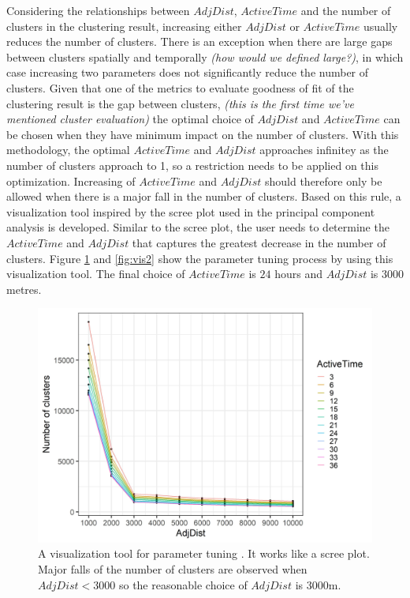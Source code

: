 Considering the relationships between \(AdjDist\), \(ActiveTime\) and
the number of clusters in the clustering result, increasing either
\(AdjDist\) or \(ActiveTime\) usually reduces the number of clusters.
There is an exception when there are large gaps between clusters
spatially and temporally \textit{(how would we defined large?)}, in
which case increasing two parameters does not significantly reduce the
number of clusters. Given that one of the metrics to evaluate goodness
of fit of the clustering result is the gap between clusters,
\textit{(this is the first time we've mentioned cluster evaluation)} the
optimal choice of \(AdjDist\) and \(ActiveTime\) can be chosen when they
have minimum impact on the number of clusters. With this methodology,
the optimal \(ActiveTime\) and \(AdjDist\) approaches infinitey as the
number of clusters approach to 1, so a restriction needs to be applied
on this optimization. Increasing of \(ActiveTime\) and \(AdjDist\)
should therefore only be allowed when there is a major fall in the
number of clusters. Based on this rule, a visualization tool inspired by
the scree plot used in the principal component analysis is developed.
Similar to the scree plot, the user needs to determine the
\(ActiveTime\) and \(AdjDist\) that captures the greatest decrease in
the number of clusters. Figure \ref{fig:vis1} and \ref{fig:vis2} show
the parameter tuning process by using this visualization tool. The final
choice of \(ActiveTime\) is \(24\) hours and \(AdjDist\) is \(3000\)
metres.

\begin{Schunk}
\begin{figure}

{\centering \includegraphics[width=0.8\linewidth]{figures/clustering_tuning_1} 

}

\caption[A visualization tool for parameter tuning ]{A visualization tool for parameter tuning . It works like a scree plot. Major falls of the number of clusters are observed when $AdjDist < 3000$ so the reasonable choice of $AdjDist$ is 3000m.}\label{fig:vis1}
\end{figure}
\end{Schunk}

